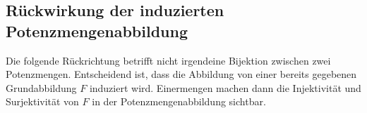 \documentclass[main.tex]{subfiles}
\begin{document}
\subsection{Rückwirkung der induzierten Potenzmengenabbildung}

Die folgende Rückrichtung betrifft nicht irgendeine Bijektion zwischen zwei
Potenzmengen.  Entscheidend ist, dass die Abbildung von einer bereits
gegebenen Grundabbildung \(F\) induziert wird.  Einermengen machen dann die
Injektivität und Surjektivität von \(F\) in der Potenzmengenabbildung
sichtbar.

\end{document}
